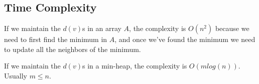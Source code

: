 \subsection{Time Complexity}
If we maintain the $ d(v) $s in an array $ A $, the complexity is $ O(n^2) $ because we need to first find the minimum in $A$, and once we've found the minimum we need to update all the neighbors of the minimum.

If we maintain the $ d(v) $s in a min-heap, the complexity is $ O(m log(n)) $. Usually $m \le n$.

















